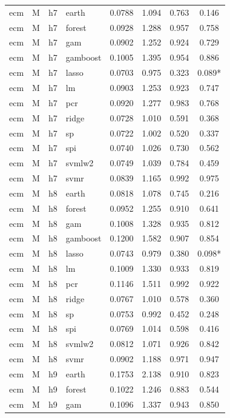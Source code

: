 \begin{ThreePartTable}
\begin{longtable}[t]{llclcccc}
\addlinespace
ecm & M & h7 & earth & 0.0788 & 1.094 & 0.763 & 0.146\\
ecm & M & h7 & forest & 0.0928 & 1.288 & 0.957 & 0.758\\
ecm & M & h7 & gam & 0.0902 & 1.252 & 0.924 & 0.729\\
ecm & M & h7 & gamboost & 0.1005 & 1.395 & 0.954 & 0.886\\
ecm & M & h7 & lasso & 0.0703 & 0.975 & 0.323 & 0.089*\\
ecm & M & h7 & lm & 0.0903 & 1.253 & 0.923 & 0.747\\
ecm & M & h7 & pcr & 0.0920 & 1.277 & 0.983 & 0.768\\
ecm & M & h7 & ridge & 0.0728 & 1.010 & 0.591 & 0.368\\
ecm & M & h7 & sp & 0.0722 & 1.002 & 0.520 & 0.337\\
ecm & M & h7 & spi & 0.0740 & 1.026 & 0.730 & 0.562\\
ecm & M & h7 & svmlw2 & 0.0749 & 1.039 & 0.784 & 0.459\\
ecm & M & h7 & svmr & 0.0839 & 1.165 & 0.992 & 0.975\\
\addlinespace
ecm & M & h8 & earth & 0.0818 & 1.078 & 0.745 & 0.216\\
ecm & M & h8 & forest & 0.0952 & 1.255 & 0.910 & 0.641\\
ecm & M & h8 & gam & 0.1008 & 1.328 & 0.935 & 0.812\\
ecm & M & h8 & gamboost & 0.1200 & 1.582 & 0.907 & 0.854\\
ecm & M & h8 & lasso & 0.0743 & 0.979 & 0.380 & 0.098*\\
ecm & M & h8 & lm & 0.1009 & 1.330 & 0.933 & 0.819\\
ecm & M & h8 & pcr & 0.1146 & 1.511 & 0.992 & 0.922\\
ecm & M & h8 & ridge & 0.0767 & 1.010 & 0.578 & 0.360\\
ecm & M & h8 & sp & 0.0753 & 0.992 & 0.452 & 0.248\\
ecm & M & h8 & spi & 0.0769 & 1.014 & 0.598 & 0.416\\
ecm & M & h8 & svmlw2 & 0.0812 & 1.071 & 0.926 & 0.842\\
ecm & M & h8 & svmr & 0.0902 & 1.188 & 0.971 & 0.947\\
\addlinespace
ecm & M & h9 & earth & 0.1753 & 2.138 & 0.910 & 0.823\\
ecm & M & h9 & forest & 0.1022 & 1.246 & 0.883 & 0.544\\
ecm & M & h9 & gam & 0.1096 & 1.337 & 0.943 & 0.850\\

\end{longtable}
\end{ThreePartTable}
